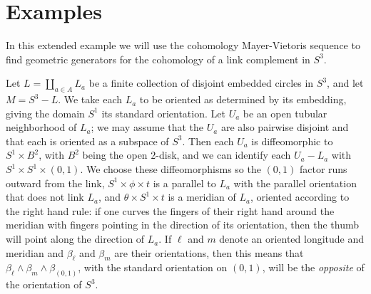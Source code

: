 
\section{Examples}\label{S: examples}

\begin{example}
In this extended example we will use the cohomology Mayer-Vietoris sequence to find geometric generators for the cohomology of a link complement in $S^3$.

Let $L = \amalg_{a \in A} L_a$ be a finite collection of disjoint embedded circles in $S^3$, and let $M = S^3 - L$.
We take each $L_a$ to be oriented as determined by its embedding, giving the domain $S^1$ its standard orientation.
Let $U_a$ be an open tubular neighborhood of $L_a$; we may assume that the $U_a$ are also pairwise disjoint and that each is oriented as a subspace of $S^3$.
Then each $U_a$ is diffeomorphic to $S^1 \times B^2$, with $B^2$ being the open $2$-disk, and we can identify each $U_a - L_a$ with $S^1 \times S^1 \times (0,1)$.
We choose these diffeomorphisms so the $(0,1)$ factor runs outward from the link, $S^1 \times \phi \times t$ is a parallel to $L_a$ with the parallel orientation that does not link $L_a$, and $\theta \times S^1 \times t$ is a meridian of $L_a$, oriented according to the right hand rule: if one curves the fingers of their right hand around the meridian with fingers pointing in the direction of its orientation, then the thumb will point along the direction of $L_a$.
If $\ell$ and $m$ denote an oriented longitude and meridian and $\beta_\ell$ and $\beta_m$ are their orientations, then this means that $\beta_\ell \wedge \beta_m \wedge \beta_{(0,1)}$, with the standard orientation on $(0,1)$, will be the \emph{opposite} of the orientation of $S^3$.


\end{example}
